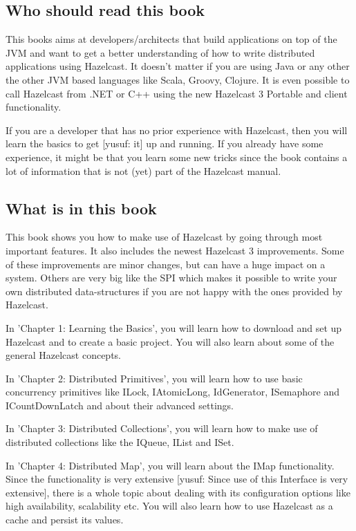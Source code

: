 \subsection*{Who should read this book}
This books aims at developers/architects that build applications on top of the JVM and want to get a better understanding of how to write distributed applications using Hazelcast. It doesn't matter if you are using Java or any other the other JVM based languages like Scala, Groovy, Clojure. It is even possible to call Hazelcast from .NET or C++ using the new Hazelcast 3 Portable and client functionality.

If you are a developer that has no prior experience with Hazelcast, then you will learn the basics to get [yusuf: it] up and running. If you already have some experience, it might be that you learn some new tricks since the book contains a lot of information that is not (yet) part of the Hazelcast manual.
 
\subsection*{What is in this book}
This book shows you how to make use of Hazelcast by going through most important features. It also includes the newest Hazelcast 3 improvements. Some of these improvements are minor changes, but can have a huge impact on a system. Others are very big like the SPI which makes it possible to write your own distributed data-structures if you are not happy with the ones provided by Hazelcast.

In 'Chapter 1: Learning the Basics', you will learn how to download and set up Hazelcast and to create a basic project. You will also learn about some of the general Hazelcast concepts.

In 'Chapter 2: Distributed Primitives', you will learn how to use basic concurrency primitives like ILock, IAtomicLong, IdGenerator, ISemaphore and ICountDownLatch and about their advanced settings.

In 'Chapter 3: Distributed Collections', you will learn how to make use of distributed collections like the IQueue, IList and ISet.

In 'Chapter 4: Distributed Map', you will learn about the IMap functionality. Since the functionality is very extensive [yusuf: Since use of this Interface is very extensive], there is a whole topic about dealing with its configuration options like high availability, scalability etc. You will also learn how to use Hazelcast as a cache and persist its values.

